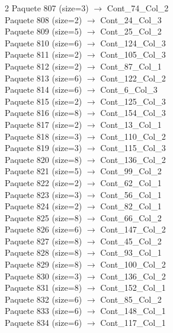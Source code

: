 \begin{multicols}{2}
Paquete 807 (size=3) $\rightarrow$ Cont\_74\_Col\_2\\
Paquete 808 (size=2) $\rightarrow$ Cont\_24\_Col\_3\\
Paquete 809 (size=5) $\rightarrow$ Cont\_25\_Col\_2\\
Paquete 810 (size=6) $\rightarrow$ Cont\_124\_Col\_3\\
Paquete 811 (size=2) $\rightarrow$ Cont\_105\_Col\_3\\
Paquete 812 (size=2) $\rightarrow$ Cont\_87\_Col\_1\\
Paquete 813 (size=6) $\rightarrow$ Cont\_122\_Col\_2\\
Paquete 814 (size=6) $\rightarrow$ Cont\_6\_Col\_3\\
Paquete 815 (size=2) $\rightarrow$ Cont\_125\_Col\_3\\
Paquete 816 (size=8) $\rightarrow$ Cont\_154\_Col\_3\\
Paquete 817 (size=2) $\rightarrow$ Cont\_13\_Col\_1\\
Paquete 818 (size=3) $\rightarrow$ Cont\_110\_Col\_2\\
Paquete 819 (size=3) $\rightarrow$ Cont\_115\_Col\_3\\
Paquete 820 (size=8) $\rightarrow$ Cont\_136\_Col\_2\\
Paquete 821 (size=5) $\rightarrow$ Cont\_99\_Col\_2\\
Paquete 822 (size=2) $\rightarrow$ Cont\_62\_Col\_1\\
Paquete 823 (size=3) $\rightarrow$ Cont\_56\_Col\_1\\
Paquete 824 (size=2) $\rightarrow$ Cont\_82\_Col\_1\\
Paquete 825 (size=8) $\rightarrow$ Cont\_66\_Col\_2\\
Paquete 826 (size=6) $\rightarrow$ Cont\_147\_Col\_2\\
Paquete 827 (size=8) $\rightarrow$ Cont\_45\_Col\_2\\
Paquete 828 (size=8) $\rightarrow$ Cont\_93\_Col\_1\\
Paquete 829 (size=8) $\rightarrow$ Cont\_100\_Col\_2\\
Paquete 830 (size=3) $\rightarrow$ Cont\_136\_Col\_2\\
Paquete 831 (size=8) $\rightarrow$ Cont\_152\_Col\_1\\
Paquete 832 (size=6) $\rightarrow$ Cont\_85\_Col\_2\\
Paquete 833 (size=6) $\rightarrow$ Cont\_148\_Col\_1\\
Paquete 834 (size=6) $\rightarrow$ Cont\_117\_Col\_1\\

\end{multicols}

